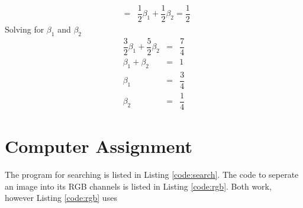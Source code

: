 \documentclass[10pt, a4paper]{article}
\begin{document}
\begin{enumerate}
\begin{eqnarray}
      &=& \dfrac{1}{2}\beta_1 + \dfrac{1}{2}\beta_2 = \dfrac{1}{2}
    \end{eqnarray}
    Solving for $\beta_1$ and $\beta_2$
    \begin{eqnarray}
      \dfrac{3}{2}\beta_1 + \dfrac{5}{2}\beta_2 &=& \dfrac{7}{4} \\  
      \beta_1 + \beta_2 &=& 1 \\
      \beta_1 &=& \dfrac{3}{4} \\
      \beta_2 &=& \dfrac{1}{4}
    \end{eqnarray}
\end{enumerate}

\section{Computer Assignment}
The program for searching is listed in Listing \ref{code:search}. The code to seperate an image into
its RGB channels is listed in Listing \ref{code:rgb}. Both work, however Listing \ref{code:rgb} uses
\end{document}
